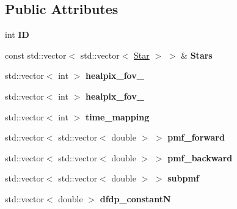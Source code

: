 \subsection*{Public Attributes}
\begin{DoxyCompactItemize}
\item 
\mbox{\label{classLikelihoodData_a9cb6c7ac3a9bfb1c9108ead8ea8fde91}} 
int {\bfseries ID}
\item 
\mbox{\label{classLikelihoodData_a4c970663e2cd6c3e0b1a8e353854ce5f}} 
const std\+::vector$<$ std\+::vector$<$ \hyperlink{classStar}{Star} $>$ $>$ \& {\bfseries Stars}
\item 
\mbox{\label{classLikelihoodData_a0c7b79c0856b8d63180245c7a423b262}} 
std\+::vector$<$ int $>$ {\bfseries healpix\+\_\+fov\+\_}
\item 
\mbox{\label{classLikelihoodData_a2caf37a2748bbb0bd91b818c3af51502}} 
std\+::vector$<$ int $>$ {\bfseries healpix\+\_\+fov\+\_}
\item 
\mbox{\label{classLikelihoodData_ab996d0af29ea194954e9ddfeba2bea9e}} 
std\+::vector$<$ int $>$ {\bfseries time\+\_\+mapping}
\item 
\mbox{\label{classLikelihoodData_a930a1b35ff6c789074f50dc56bada379}} 
std\+::vector$<$ std\+::vector$<$ double $>$ $>$ {\bfseries pmf\+\_\+forward}
\item 
\mbox{\label{classLikelihoodData_aaf104aa3161c2a6be5f1db9aa946c4ab}} 
std\+::vector$<$ std\+::vector$<$ double $>$ $>$ {\bfseries pmf\+\_\+backward}
\item 
\mbox{\label{classLikelihoodData_a22d6828dd96c1d54a3b70fe0ef613b15}} 
std\+::vector$<$ std\+::vector$<$ double $>$ $>$ {\bfseries subpmf}
\item 
\mbox{\label{classLikelihoodData_ac6d1fcbd9277f3858edf5330f4ddf9ba}} 
std\+::vector$<$ double $>$ {\bfseries dfdp\+\_\+constantN}
\item 
\mbox{\label{classLikelihoodData_a5778396081010881534302e7cc999b1f}} 

\end{DoxyCompactItemize}
